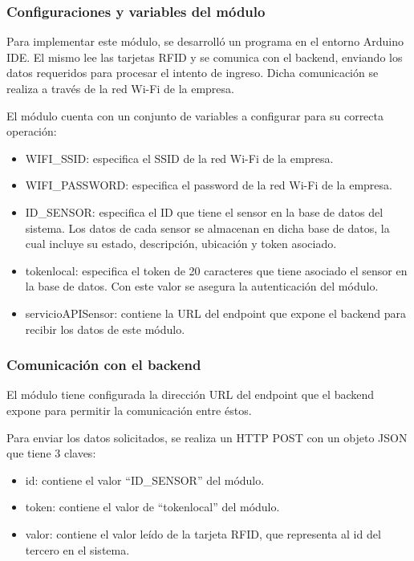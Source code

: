 \subsubsection{Configuraciones y variables del módulo}

Para implementar este módulo, se desarrolló un programa en el entorno Arduino IDE. El mismo lee las tarjetas RFID y se comunica con el backend, enviando los datos requeridos para procesar el intento de ingreso. Dicha comunicación se realiza a través de la red Wi-Fi de la empresa.

\pagebreak
El módulo cuenta con un conjunto de variables a configurar para su correcta operación:

\begin{itemize}
\item WIFI\_SSID: especifica el SSID de la red Wi-Fi de la empresa.
\item WIFI\_PASSWORD: especifica el password de la red Wi-Fi de la empresa.
\item ID\_SENSOR: especifica el ID que tiene el sensor en la base de datos del sistema. Los datos de cada sensor se almacenan en dicha base de datos, la cual incluye su estado, descripción, ubicación y token asociado.
\item tokenlocal: especifica el token de 20 caracteres que tiene asociado el sensor en la base de datos. Con este valor se asegura la autenticación del módulo.
\item servicioAPISensor: contiene la URL del endpoint que expone el backend para recibir los datos de este módulo.
\end{itemize}

\subsubsection{Comunicación con el backend}

El módulo tiene configurada la dirección URL del endpoint que el backend expone para permitir la comunicación entre éstos.

Para enviar los datos solicitados, se realiza un HTTP POST con un objeto JSON que tiene 3 claves:

\begin{itemize}
\item id: contiene el valor ``ID\_SENSOR'' del módulo.
\item token: contiene el valor de ``tokenlocal'' del módulo.
\item valor: contiene el valor leído de la tarjeta RFID, que representa al id del tercero en el sistema.
\end{itemize}

